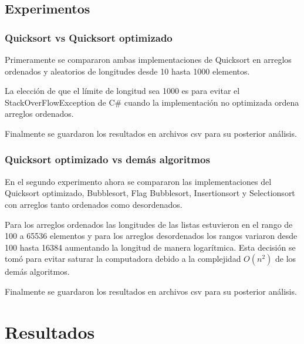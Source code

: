 \documentclass[conference]{IEEEtran}
\begin{document}
\subsection{Experimentos}
\subsubsection{Quicksort vs Quicksort optimizado}
Primeramente se compararon ambas implementaciones de Quicksort en arreglos ordenados y aleatorios de longitudes desde 10 hasta 1000 elementos.\par
La elección de que el límite de longitud sea 1000 es para evitar el StackOverFlowException\cite{stackoverflowexception} de C\# cuando la implementación no optimizada ordena arreglos ordenados.\par
Finalmente se guardaron los resultados en archivos csv para su posterior análisis.



\subsubsection{Quicksort optimizado vs demás algoritmos}
En el segundo experimento ahora se compararon las implementaciones del Quicksort optimizado, Bubblesort, Flag Bubblesort, Insertionsort y Selectionsort con arreglos tanto ordenados como desordenados.\par
Para los arreglos ordenados las longitudes de las listas estuvieron en el rango de 100 a 65536 elementos y para los arreglos desordenados los rangos variaron desde 100 hasta 16384 aumentando la longitud de manera logarítmica. Esta decisión se tomó para evitar saturar la computadora debido a la complejidad $O(n^2)$ de los demás algoritmos.\par
Finalmente se guardaron los resultados en archivos csv para su posterior análisis.



\section{Resultados}
\end{document}
